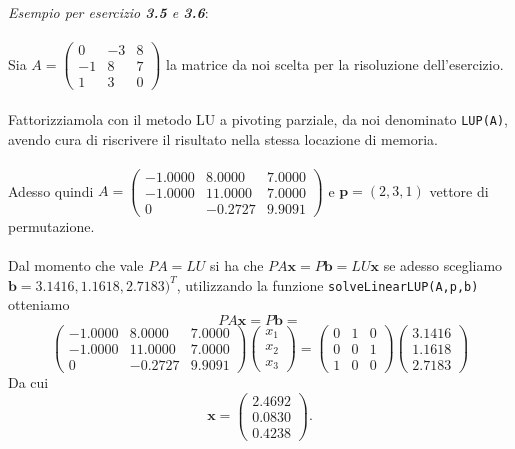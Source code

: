 \textit{Esempio per esercizio \textbf{3.5} e \textbf{3.6}}:\\ \\
Sia 
\( A = 
\begin{pmatrix}
  0 & -3 & 8 \\
  -1 & 8 & 7 \\
  1 & 3 & 0
 \end{pmatrix}
\) la matrice da noi scelta per la risoluzione dell'esercizio. \\ \\ Fattorizziamola con il metodo LU a pivoting parziale, da noi denominato \texttt{LUP(A)}, avendo cura di riscrivere il risultato nella stessa locazione di memoria. \\ \\ Adesso quindi $A = 
\begin{pmatrix}
  -1.0000 & 8.0000 & 7.0000 \\
  -1.0000 & 11.0000 & 7.0000 \\
  0 & -0.2727 & 9.9091
 \end{pmatrix}
$ e $\mathbf{p} = (2,3,1)$ vettore di permutazione.
\\ \\ 
Dal momento che vale $PA=LU$ si ha che $PA\mathbf{x} = P\mathbf{b} = LU\mathbf{x}$
se adesso scegliamo $\mathbf{b} = 3.1416,1.1618,2.7183)^T$, utilizzando la funzione \texttt{solveLinearLUP(A,p,b)} otteniamo 
\[
PA\mathbf{x} = P\mathbf{b} = \]
\[
\begin{pmatrix}
  -1.0000 & 8.0000 & 7.0000 \\
  -1.0000 & 11.0000 & 7.0000 \\
  0 & -0.2727 & 9.9091
 \end{pmatrix} \begin{pmatrix}x_1\\x_2\\x_3\end{pmatrix} = \begin{pmatrix}
 0 & 1 & 0 \\
  0 & 0 & 1 \\
  1 & 0 & 0
 \end{pmatrix} \begin{pmatrix}3.1416\\1.1618\\2.7183\end{pmatrix}
\]
Da cui 
\[
\mathbf{x} = \begin{pmatrix}2.4692 \\ 0.0830 \\ 0.4238 \end{pmatrix}.
\]\\ 
